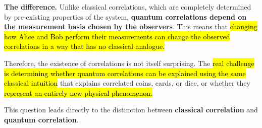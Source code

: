 \highspace
\textcolor{Red2}{ \textbf{The difference.}} Unlike classical correlations, which are completely determined by pre-existing properties of the system, \textbf{quantum correlations depend on the measurement basis chosen by the observers}. This means that \hl{changing how Alice and Bob perform their measurements can change the observed correlations in a way that has no classical analogue.}

\highspace
Therefore, the existence of correlations is not itself surprising. The \hl{real challenge is determining whether quantum correlations can be explained using the same classical intuition} that explains correlated coins, cards, or dice, or whether they \hl{represent an entirely new physical phenomenon.}

\highspace
This question leads directly to the distinction between \textbf{classical correlation} and \textbf{quantum correlation}.